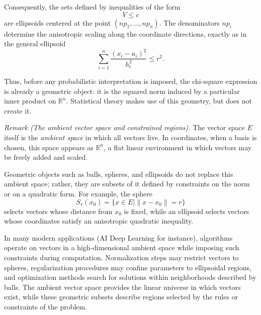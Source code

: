 \medskip

Consequently, the sets defined by inequalities of the form
\[
V \le c
\]
are ellipsoids centered at the point $(np_1,\dots,np_n)$.
The denominators $np_i$ determine the anisotropic scaling along the coordinate
directions, exactly as in the general ellipsoid
\[
\sum_{i=1}^n \frac{(x_i-a_i)^2}{h_i^2} \le r^2.
\]

\medskip

Thus, before any probabilistic interpretation is imposed, the chi-square
expression is already a geometric object: it is the squared norm induced by a
particular inner product on $\mathbb{R}^n$.
Statistical theory makes use of this geometry, but does not create it.

\medskip

\textit{Remark (The ambient vector space and constrained regions).}
The vector space $E$ itself is the \emph{ambient space} in which all vectors
live.
In coordinates, when a basis is chosen, this space appears as $\mathbb{R}^n$,
a flat linear environment in which vectors may be freely added and scaled.

\medskip

Geometric objects such as balls, spheres, and ellipsoids do not replace this
ambient space; rather, they are subsets of it defined by constraints on the
norm or on a quadratic form.
For example, the sphere
\[
S_r(x_0)=\{x\in E \mid \|x-x_0\|=r\}
\]
selects vectors whose distance from $x_0$ is fixed, while an ellipsoid selects
vectors whose coordinates satisfy an anisotropic quadratic inequality.

\medskip

In many modern applications (AI Deep Learning for instance), algorithms operate
on vectors in a high-dimensional ambient space while imposing such constraints
during computation.
Normalization steps may restrict vectors to spheres, regularization procedures
may confine parameters to ellipsoidal regions, and optimization methods search
for solutions within neighborhoods described by balls.
The ambient vector space provides the linear universe in which vectors exist,
while these geometric subsets describe regions selected by the rules or
constraints of the problem.